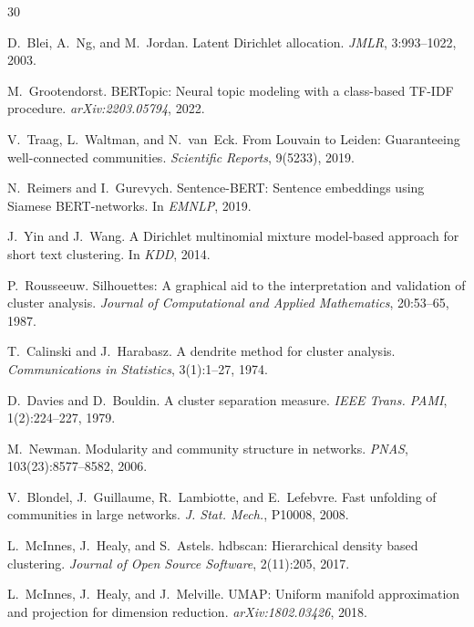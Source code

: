 \documentclass[10pt,twocolumn,twoside]{article}
\begin{document}
\begin{thebibliography}{30}

D.~Blei, A.~Ng, and M.~Jordan.
Latent Dirichlet allocation.
\textit{JMLR}, 3:993--1022, 2003.

M.~Grootendorst.
BERTopic: Neural topic modeling with a class-based TF-IDF procedure.
\textit{arXiv:2203.05794}, 2022.

V.~Traag, L.~Waltman, and N.~van~Eck.
From Louvain to Leiden: Guaranteeing well-connected communities.
\textit{Scientific Reports}, 9(5233), 2019.

N.~Reimers and I.~Gurevych.
Sentence-BERT: Sentence embeddings using Siamese BERT-networks.
In \textit{EMNLP}, 2019.

J.~Yin and J.~Wang.
A Dirichlet multinomial mixture model-based approach for short text clustering.
In \textit{KDD}, 2014.

P.~Rousseeuw.
Silhouettes: A graphical aid to the interpretation and validation of cluster analysis.
\textit{Journal of Computational and Applied Mathematics}, 20:53--65, 1987.

T.~Calinski and J.~Harabasz.
A dendrite method for cluster analysis.
\textit{Communications in Statistics}, 3(1):1--27, 1974.

D.~Davies and D.~Bouldin.
A cluster separation measure.
\textit{IEEE Trans. PAMI}, 1(2):224--227, 1979.

M.~Newman.
Modularity and community structure in networks.
\textit{PNAS}, 103(23):8577--8582, 2006.

V.~Blondel, J.~Guillaume, R.~Lambiotte, and E.~Lefebvre.
Fast unfolding of communities in large networks.
\textit{J. Stat. Mech.}, P10008, 2008.

L.~McInnes, J.~Healy, and S.~Astels.
hdbscan: Hierarchical density based clustering.
\textit{Journal of Open Source Software}, 2(11):205, 2017.

L.~McInnes, J.~Healy, and J.~Melville.
UMAP: Uniform manifold approximation and projection for dimension reduction.
\textit{arXiv:1802.03426}, 2018.


\end{thebibliography}
\end{document}
